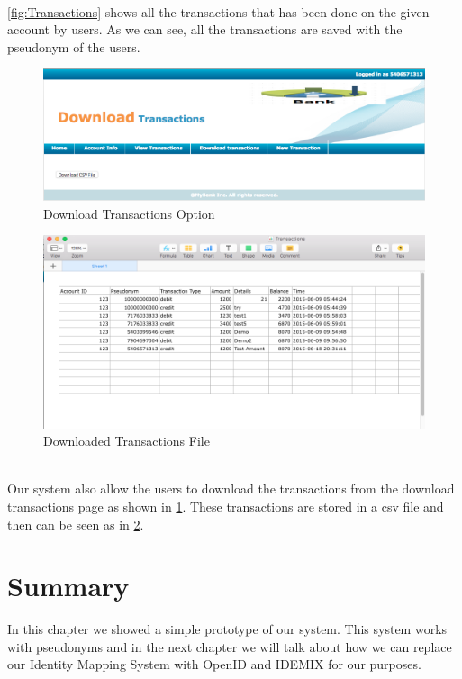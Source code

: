 \\\ref{fig:Transactions} shows all the transactions that has been done on the given account by users. As we can see, all the transactions are saved with the pseudonym of the users.
\begin{figure}[h]
	\centering
	\includegraphics[width=\textwidth]{figures/Download}
	\caption{Download Transactions Option}
	\label{fig:Download}
\end{figure}
\begin{figure}[h]
	\centering
	\includegraphics[width=\textwidth]{figures/File}
	\caption{Downloaded Transactions File}
	\label{fig:File}
\end{figure}	
\\Our system also allow the users to download the transactions from the download transactions page as shown in \ref{fig:Download}. These transactions are stored in a csv file and then can be seen as in \ref{fig:File}.
\section{Summary}
In this chapter we showed a simple prototype of our system. This system works with pseudonyms and in the next chapter we will talk about how we can replace our Identity Mapping System with OpenID and IDEMIX for our purposes.